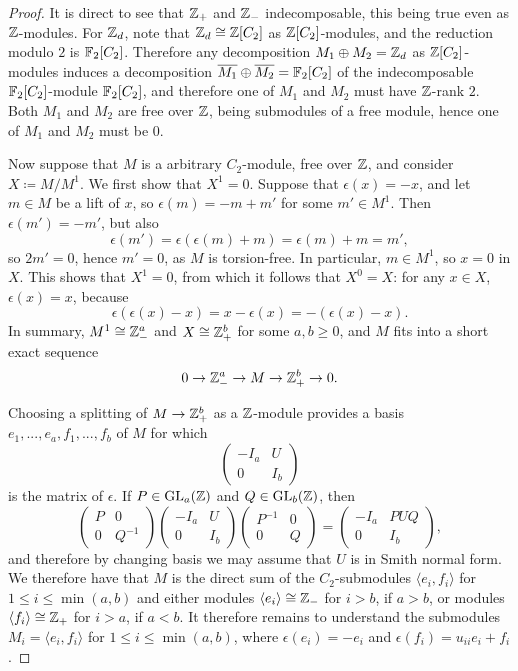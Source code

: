 \begin{proof}
It is direct to see that ${\mathbb Z}_+$ and ${\mathbb Z}_-$ indecomposable, this being true even as ${\mathbb Z}$-modules. For ${\mathbb Z}_d$, note that ${\mathbb Z}_d \cong {\mathbb Z}[C_2]$ as ${\mathbb Z}[C_2]$-modules, and the reduction modulo $2$ is ${\mathbb F}_2[C_2]$. Therefore any decomposition $M_1 \oplus M_2 = {\mathbb Z}_d$ as ${\mathbb Z}[C_2]$-modules induces a decomposition $\overline{M_1} \oplus \overline{M_2} = {\mathbb F}_2[C_2]$ of the indecomposable ${\mathbb F}_2[C_2]$-module ${\mathbb F}_2[C_2]$, and therefore one of $M_1$ and $M_2$ must have ${\mathbb Z}$-rank $2$. Both $M_1$ and $M_2$ are free over ${\mathbb Z}$, being submodules of a free module, hence one of $M_1$ and $M_2$ must be $0$.

Now suppose that $M$ is a arbitrary $C_2$-module, free over ${\mathbb Z}$, and consider $X \coloneqq M / M^1$. We first show that $X^1 = 0$. Suppose that $\epsilon(x) = - x$, and let $m \in M$ be a lift of $x$, so $\epsilon(m) = - m + m'$ for some $m' \in M^1$. Then $\epsilon(m') = -m'$, but also
\[
  \epsilon(m') = \epsilon(\epsilon(m) + m) = \epsilon(m) + m = m',
\]
so $2m' = 0$, hence $m' = 0$, as $M$ is torsion-free. In particular, $m \in M^1$, so $x = 0$ in $X$. This shows that $X^1 = 0$, from which it follows that $X^0 = X$: for any $x \in X$, $\epsilon(x) = x$, because
\[
\epsilon(\epsilon(x) - x) = x - \epsilon(x) = - (\epsilon(x) - x).
\]
In summary, $M^1 \cong {\mathbb Z}_{-}^{a}$ and $X \cong {\mathbb Z}_{+}^{b}$ for some $a, b \geq 0$, and $M$ fits into a short exact sequence
\[
0 \rightarrow {\mathbb Z}_{-}^{a} \rightarrow M \rightarrow {\mathbb Z}_{+}^{b} \rightarrow 0.
\]

Choosing a splitting of $M \rightarrow {\mathbb Z}_{+}^{b}$ as a ${\mathbb Z}$-module provides a basis $e_1, ... , e_a, f_1, ... , f_b$ of $M$ for which
\[
\begin{pmatrix}
  -I_a & U \\ 0 & I_b
\end{pmatrix}
\]
is the matrix of $\epsilon$. If $P \in \operatorname{GL}_a({\mathbb Z})$ and $Q \in \operatorname{GL}_b({\mathbb Z})$, then
\[
\begin{pmatrix}
  P & 0 \\ 0 & Q^{-1}
\end{pmatrix}
\begin{pmatrix}
  -I_a & U \\ 0 & I_b
\end{pmatrix}
\begin{pmatrix}
  P^{-1} & 0 \\ 0 & Q
\end{pmatrix} = \begin{pmatrix}
  -I_a & PUQ \\ 0 & I_b
\end{pmatrix},
\]
and therefore by changing basis we may assume that $U$ is in Smith normal form. We therefore have that $M$ is the direct sum of the $C_2$-submodules $\langle e_i, f_i \rangle$ for $1 \leq i \leq \min(a,b)$ and either modules $\langle e_i \rangle \cong {\mathbb Z}_-$ for $i > b$, if $a>b$, or modules $\langle f_i \rangle \cong {\mathbb Z}_+$ for $i>a$, if $a<b$. It therefore remains to understand the submodules $M_i = \langle e_i, f_i \rangle$ for $1 \leq i \leq \min(a,b)$, where $\epsilon(e_i) = -e_i$ and $\epsilon(f_i) = u_{ii} e_i + f_i$.


\end{proof}
